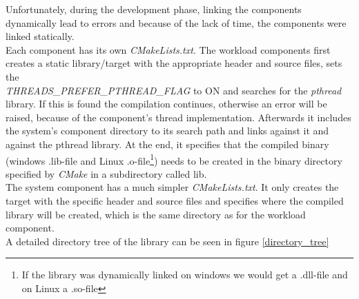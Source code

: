 Unfortunately, during the development phase, linking the components dynamically lead to errors and because of the lack of time, the components were linked statically.\\
Each component has its own \textit{CMakeLists.txt}. The workload components first creates a static library/target with the appropriate header and source files, sets the \\ \textit{THREADS\_PREFER\_PTHREAD\_FLAG} to ON and searches for the \textit{pthread} library. If this is found the compilation continues, otherwise an error will be raised, because of the component's thread implementation. Afterwards it includes the system's component directory to its search path and links against it and against the pthread library. At the end, it specifies that the compiled binary (windows .lib-file and Linux .o-file\footnote{If the library was dynamically linked on windows we would get a .dll-file and on Linux a .so-file}) needs to be created in the binary directory specified by \textit{CMake} in a subdirectory called \dq lib\dq{}.\\
The system component has a much simpler \textit{CMakeLists.txt}. It only creates the target with the specific header and source files and specifies where the compiled library will be created, which is the same directory as for the workload component.\\
A detailed directory tree of the library can be seen in figure \ref{directory_tree}
